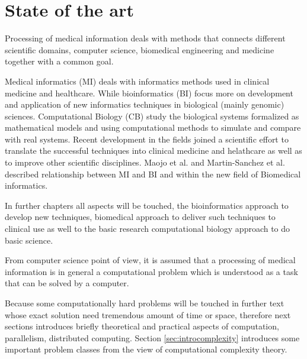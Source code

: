 \chapter{State of the art}
\label{sec:stateoftheart}


Processing of medical information deals with methods that connects different scientific domains, computer science, biomedical engineering and medicine together with a common goal. 

Medical informatics (MI) deals with informatics methods used in clinical medicine and healthcare. While bioinformatics (BI) focus more on development and application of new informatics techniques in biological (mainly genomic) sciences. Computational Biology (CB) study the biological systems formalized as mathematical models and using computational methods to simulate and compare with real systems. Recent development in the fields joined a scientific effort to translate the successful techniques into clinical medicine and helathcare as well as to improve other scientific disciplines.
Maojo et al. \cite{Maojo2003} and Martin-Sanchez et al.\cite{Martin-Sanchez2004} described relationship between MI and BI and within the new field of Biomedical informatics.

In further chapters all aspects will be touched, the bioinformatics approach to develop new techniques, biomedical approach to deliver such techniques to clinical use as well to the basic research  computational biology approach to do basic science.


From computer science point of view, it is assumed that a processing of medical information is in general a computational problem which is understood as a task that can be solved by a computer. 

Because some computationally hard problems will be touched in further text whose exact solution need tremendous amount of time or space, therefore next sections introduces briefly theoretical and practical aspects of computation, parallelism, distributed computing. Section \ref{sec:introcomplexity} introduces some important problem classes from the view of computational complexity theory. 

